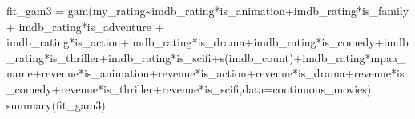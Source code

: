 \documentclass[
]{article}
\newenvironment{Shaded}{\begin{snugshade}}{\end{snugshade}}
\newcommand{\AttributeTok}[1]{\textcolor[rgb]{0.77,0.63,0.00}{#1}}
\newcommand{\FunctionTok}[1]{\textcolor[rgb]{0.00,0.00,0.00}{#1}}
\newcommand{\NormalTok}[1]{#1}
\newcommand{\OtherTok}[1]{\textcolor[rgb]{0.56,0.35,0.01}{#1}}
\newcommand{\SpecialCharTok}[1]{\textcolor[rgb]{0.00,0.00,0.00}{#1}}
\begin{document}
\begin{Shaded}
\begin{Highlighting}[]
\NormalTok{fit\_gam3 }\OtherTok{=} \FunctionTok{gam}\NormalTok{(my\_rating}\SpecialCharTok{\textasciitilde{}}\NormalTok{imdb\_rating}\SpecialCharTok{*}\NormalTok{is\_animation}\SpecialCharTok{+}\NormalTok{imdb\_rating}\SpecialCharTok{*}\NormalTok{is\_family }\SpecialCharTok{+}\NormalTok{ imdb\_rating}\SpecialCharTok{*}\NormalTok{is\_adventure }\SpecialCharTok{+}\NormalTok{ imdb\_rating}\SpecialCharTok{*}\NormalTok{is\_action}\SpecialCharTok{+}\NormalTok{imdb\_rating}\SpecialCharTok{*}\NormalTok{is\_drama}\SpecialCharTok{+}\NormalTok{imdb\_rating}\SpecialCharTok{*}\NormalTok{is\_comedy}\SpecialCharTok{+}\NormalTok{imdb\_rating}\SpecialCharTok{*}\NormalTok{is\_thriller}\SpecialCharTok{+}\NormalTok{imdb\_rating}\SpecialCharTok{*}\NormalTok{is\_scifi}\SpecialCharTok{+}\FunctionTok{s}\NormalTok{(imdb\_count)}\SpecialCharTok{+}\NormalTok{imdb\_rating}\SpecialCharTok{*}\NormalTok{mpaa\_name}\SpecialCharTok{+}\NormalTok{revenue}\SpecialCharTok{*}\NormalTok{is\_animation}\SpecialCharTok{+}\NormalTok{revenue}\SpecialCharTok{*}\NormalTok{is\_action}\SpecialCharTok{+}\NormalTok{revenue}\SpecialCharTok{*}\NormalTok{is\_drama}\SpecialCharTok{+}\NormalTok{revenue}\SpecialCharTok{*}\NormalTok{is\_comedy}\SpecialCharTok{+}\NormalTok{revenue}\SpecialCharTok{*}\NormalTok{is\_thriller}\SpecialCharTok{+}\NormalTok{revenue}\SpecialCharTok{*}\NormalTok{is\_scifi,}\AttributeTok{data=}\NormalTok{continuous\_movies)}
\FunctionTok{summary}\NormalTok{(fit\_gam3)}
\end{Highlighting}
\end{Shaded}
\end{document}
